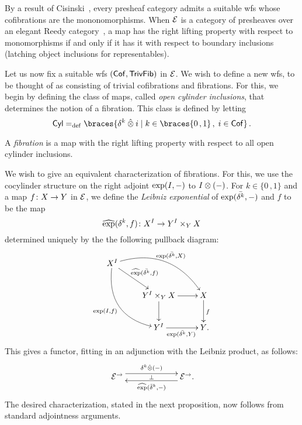 \documentclass[reqno,10pt,a4paper,oneside,draft]{amsart}
\begin{document}
\begin{example} \label{thm:generation-presheaf-cisinski}
By a result of Cisinski~\cite[Proposition~1.2.27]{cisinski-asterisque}, every presheaf category admits a suitable wfs whose cofibrations are the mononomorphisms.
When $\cal{E}$ is a category of presheaves over an elegant Reedy category~\cite{bergner-rezk-elegant}, a map has the right lifting property with respect to monomorphisms if and only if it has it with respect to boundary inclusions (latching object inclusions for representables).
\end{example}

Let us now fix a suitable wfs $(\Cof,\TrivFib)$ in $\catE$.
We wish to define a new wfs, to be thought of as consisting of trivial cofibrations and fibrations.
For this, we begin by defining the class of maps, called \emph{open cylinder inclusions}, that determines the notion of a fibration.
This class is defined by letting
\begin{equation} \label{equ:cylinc}
\Cyl \defeq \braces{\kcyl \hatotimes i \mid k \in \braces{0\,, 1} \, , \; i \in \Cof}
\, .\end{equation}

\begin{definition} \label{thm:fib}
A \emph{fibration} is a map with the right lifting property with respect to all open cylinder inclusions.
\end{definition}

We wish to give an equivalent characterization of fibrations.
For this, we use the cocylinder structure on the right adjoint $\exp(\interval, -)$ to $\interval \otimes (-)$.
For $k \in \{ 0 \, , 1 \}$ and a map $f \co X \to Y$ in $\calE$, we define the \emph{Leibniz exponential} of
$\exp(\bar{\kcyl}, -)$ and $f$ to be the map
\[
\hatexp(\kcyl, f) \co X^\interval \to Y^\interval \times_{Y} X
\]
determined uniquely by the the following pullback diagram:
\[
\xymatrix{
X^\interval \ar@/^2pc/[drr]^-{\exp(\bar{\kcyl}, X)}  \ar@/_2pc/[ddr]_{\exp(\interval, f)} \ar[dr]^-{\hatexp(\bar{\kcyl}, f)} &  & \\
  &   Y^\interval \times_{Y} X    \ar[d] \ar[r]  & X \ar[d]^f \\
  & Y^\interval \ar[r]_{\exp(\bar{\kcyl}, Y)} & Y \rlap{.} }
  \]
This gives a functor, fitting in an adjunction with the Leibniz product, as follows:
\begin{equation}
\label{equ:leibniz-prod-exp}
\xymatrix@C+4em{
  \catE^\to
  \ar@<1ex>[r]^{\kcyl \hatotimes (-)}
  \ar@{}[r]|{\bot}
&
  \catE^\to
  \ar@<1ex>[l]^{\hatexp(\bar{\delta}^k, -)}
\rlap{.}}
\end{equation}
The desired characterization, stated in the next proposition, now follows from standard adjointness arguments.
\end{document}
